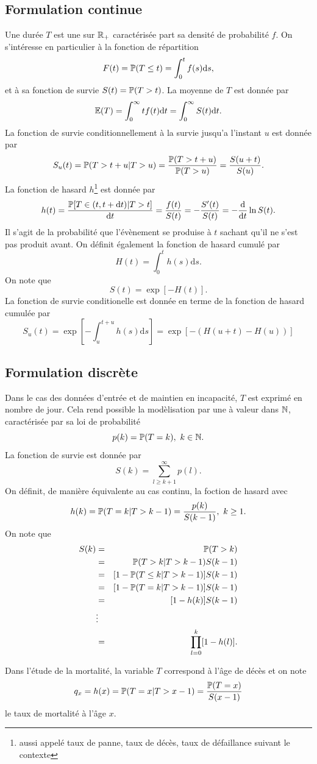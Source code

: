 \subsection{Formulation continue}
 Une durée $T$ est une \va sur $\mathbb{R}_+$ caractérisée part sa densité de probabilité $f$. On s'intéresse en particulier à la fonction de répartition 
$$
F(t)=\mathbb{P}(T\leq t) = \int_0^t f(s)\text{d}s,
$$ 
et à sa fonction de survie $S(t) = \mathbb{P}(T>t)$. La moyenne de $T$ est donnée par 
$$
\mathbb{E}(T) = \int_0^\infty t f(t)\text{d}t = \int_0^\infty S(t)\text{d}t.
$$
La fonction de survie conditionnellement à la survie jusqu'a l'instant $u$ est donnée par 
$$
S_u(t) = \mathbb{P}(T> t+u|T>u) = \frac{\mathbb{P}(T> t+u)}{\mathbb{P}(T>u)} = \frac{S(u+t)}{S(u)}.
$$
La fonction de hasard $h$\footnote{aussi appelé taux de panne, taux de décès, taux de défaillance suivant le contexte} est donnée par 
$$
h(t) =\frac{\mathbb{P}[T\in(t,t+\text{d}t)|T>t]}{\text{d}t}= \frac{f(t)}{S(t)}= -\frac{S'(t)}{S(t)} = -\frac{\text{d}}{\text{d}t}\ln S(t).
$$
Il s'agit de la probabilité que l'évènement se produise à $t$ sachant qu'il ne s'est pas produit avant. On définit également la fonction de hasard cumulé par 
$$
H(t) = \int_0^th(s)\text{d}s.
$$
On note que 
$$
S(t) = \exp[-H(t)].
$$
La fonction de survie conditionelle est donnée en terme de la fonction de hasard cumulée par 
$$
S_u(t) = \exp\left[-\int_u^{t+u}h(s)\text{d}s\right] = \exp\left[-(H(u+t)-H(u))\right]
$$
\subsection{Formulation discrète}
Dans le cas des données d'entrée et de maintien en incapacité, $T$ est exprimé en nombre de jour. Cela rend possible la modèlisation par une \va à valeur dans $\mathbb{N}$, caractérisée par sa loi de probabilité 
$$
p(k) = \mathbb{P}(T=k),\text{ }k\in\mathbb{N}.
$$
La fonction de survie est donnée par 
$$
S(k) = \sum_{l\geq k+1}^\infty p(l).
$$
On définit, de manière équivalente au cas continu, la foction de hasard avec 
$$
h(k) = \mathbb{P}(T = k|T>k-1) = \frac{p(k)}{S(k-1)},\text{ }k\geq 1.
$$
On note que 
\begin{eqnarray*}
S(k) &=& \mathbb{P}(T>k)\\
&=& \mathbb{P}(T>k|T>k-1)S(k-1)\\
&=& [1-\mathbb{P}(T\leq k|T>k-1)]S(k-1)\\
&=& [1-\mathbb{P}(T= k|T>k-1)]S(k-1)\\
&=& [1-h(k)]S(k-1)\\
&\vdots&\\
&=&\prod_{l=0}^k[1-h(l)].
\end{eqnarray*}
\begin{remark}
Dans l'étude de la mortalité, la variable $T$ correspond à l'âge de décès et on note 
$$
q_x = h(x) = \mathbb{P}(T=x|T> x-1) = \frac{\mathbb{P}(T=x)}{S(x-1)}
$$
le taux de mortalité à l'âge $x$.
\end{remark}

